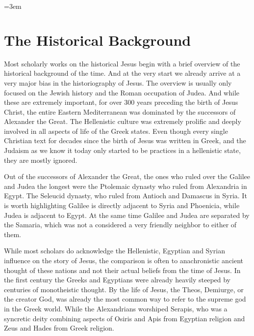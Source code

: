 \hfuzz=5pt %
\emergencystretch=3em %

\section{The Historical Background}\label{par:background-historical}

Most scholarly works on the historical Jesus begin with a brief overview of the historical background of the time.
And at the very start we already arrive at a very major bias in the historiography of Jesus.
The overview is usually only focused on the Jewish history and the Roman occupation of Judea.
And while these are extremely important, for over 300 years preceding the birth of Jesus Christ, the entire Eastern Mediterranean was dominated by the successors of Alexander the Great.
The Hellenistic culture was extremely prolific and deeply involved in all aspects of life of the Greek states.
Even though every single Christian text for decades since the birth of Jesus was written in Greek, and the Judaism as we know it today only started to be practices in a hellenistic state, they are mostly ignored.

Out of the successors of Alexander the Great, the ones who ruled over the Galilee and Judea the longest were the Ptolemaic dynasty who ruled from Alexandria in Egypt.
The Seleucid dynasty, who ruled from Antioch and Damascus in Syria.
It is worth highlighting Galilee is directly adjacent to Syria and Phoenicia, while Judea is adjacent to Egypt.
At the same time Galilee and Judea are separated by the Samaria, which was not a considered a very friendly neighbor to either of them.

While most scholars do acknowledge the Hellenistic, Egyptian and Syrian influence on the story of Jesus, the comparison is often to anachronistic ancient thought of these nations and not their actual beliefs from the time of Jesus.
In the first century the Greeks and Egyptians were already heavily steeped by centuries of monotheistic thought.
By the life of Jesus, the Theos, Demiurge, or the creator God, was already the most common way to refer to the supreme god in the Greek world.
While the Alexandrians worshiped Serapis, who was a syncretic deity combining aspects of Osiris and Apis from Egyptian religion and Zeus and Hades from Greek religion.

